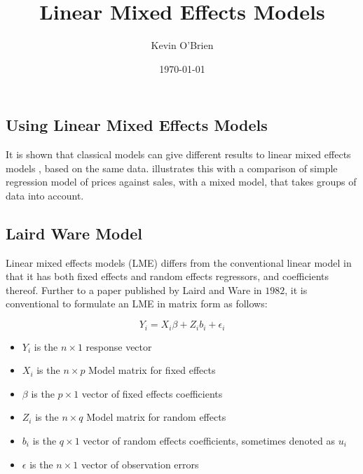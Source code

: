 \documentclass[12pt, a4paper]{report}
\begin{document}
\author{Kevin O'Brien}
\title{Linear Mixed Effects Models}
\date{\today}
\maketitle

\tableofcontents \setcounter{tocdepth}{2}

\newpage


\subsection{Using Linear Mixed Effects Models} It is shown that
classical models can give different results to linear mixed
effects models , based on the same data. \citet{Demi} illustrates
this with a comparison of simple regression model of prices
against sales, with a mixed model, that takes groups of data into
account.


\subsection{Laird Ware Model} Linear mixed effects models (LME)
differs from the conventional linear model in that it has both
fixed effects and random effects regressors, and coefficients
thereof. Further to a paper published by Laird and Ware in $1982$,
it is conventional to formulate  an LME in matrix form as follows:

  \begin{displaymath}
      Y_{i} =X_{i}\beta + Z_{i}b_{i} + \epsilon_{i}
  \end{displaymath}
\begin{itemize}
\item $Y_{i}$ is the $n \times 1$ response vector \item $X_{i}$ is
the $n \times p$ Model matrix for fixed effects \item $\beta$ is
the $p \times 1$ vector of fixed effects coefficients \item
$Z_{i}$ is the $n \times q$ Model matrix for random effects \item
$b_{i}$ is the $q \times 1$ vector of random effects coefficients,
sometimes denoted as $u_{i}$ \item $\epsilon$ is the $n \times 1$
vector of observation errors
\end{itemize}
\end{document}

